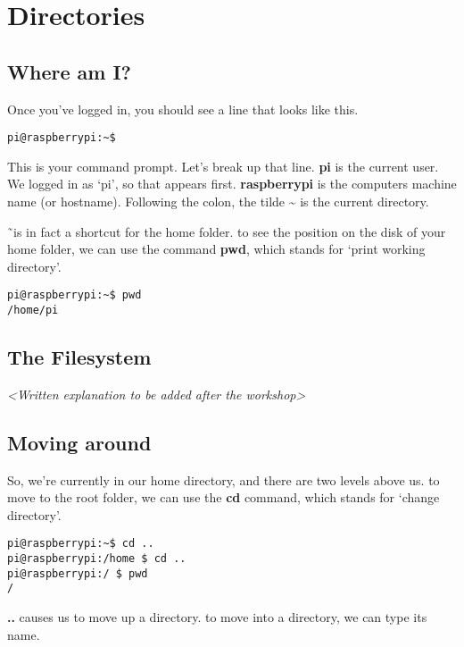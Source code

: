 \section{Directories}

	\subsection{Where am I?}
	
		Once you've logged in, you should see a line that looks like this.
	
\begin{lstlisting}
pi@raspberrypi:~$
\end{lstlisting}
	
		This is your command prompt. Let's break up that line. \textbf{pi} is the current user. We logged in as `pi', so that appears first. \textbf{raspberrypi} is the computers machine name (or hostname). Following the colon, the tilde \textbf{\~} is the current directory.
		
		\~\ is in fact a shortcut for the home folder. to see the position on the disk of your home folder, we can use the command \textbf{pwd}, which stands for `print working directory'.

\begin{lstlisting}
pi@raspberrypi:~$ pwd
/home/pi
\end{lstlisting}
	
	\subsection{The Filesystem}
	
		\textit{<Written explanation to be added after the workshop>}
	
	\subsection{Moving around}
	
		So, we're currently in our home directory, and there are two levels above us. to move to the root folder, we can use the \textbf{cd} command, which stands for `change directory'.
		
\begin{lstlisting}
pi@raspberrypi:~$ cd ..
pi@raspberrypi:/home $ cd ..
pi@raspberrypi:/ $ pwd
/
\end{lstlisting}

		\textbf{..} causes us to move up a directory. to move into a directory, we can type its name.
	
